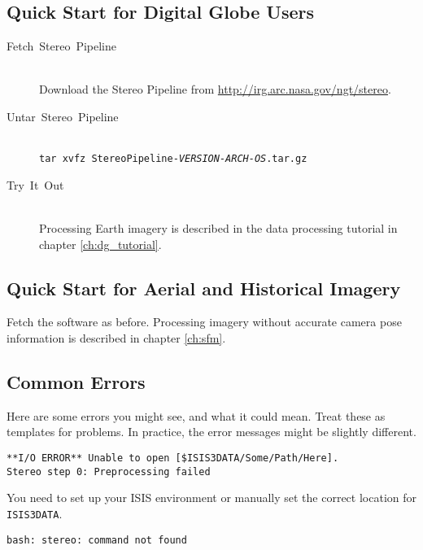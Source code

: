 \subsection{Quick Start for Digital Globe Users}
\label{quickstartDG}
\begin{description}

\item[{Fetch~Stereo~Pipeline}] ~\\
Download the Stereo Pipeline from \url{http://irg.arc.nasa.gov/ngt/stereo}.

\item[{Untar~Stereo~Pipeline}] ~\\
\texttt{tar xvfz StereoPipeline-\textit{VERSION-ARCH-OS}.tar.gz}

\item [{Try~It~Out}] ~\\
Processing Earth imagery is described in the data processing tutorial
in chapter \ref{ch:dg_tutorial}.

\end{description}

\subsection{Quick Start for Aerial and Historical Imagery}
\label{quickstartAerial}

Fetch the software as before. Processing imagery without accurate camera
pose information is described in chapter \ref{ch:sfm}.

\subsection{Common Errors}

Here are some errors you might see, and what it could mean. Treat
these as templates for problems.  In practice, the error messages might
be slightly different.

\begin{verbatim}
**I/O ERROR** Unable to open [$ISIS3DATA/Some/Path/Here].
Stereo step 0: Preprocessing failed
\end{verbatim} %

You need to set up your ISIS environment or manually set the correct
location for \texttt{ISIS3DATA}.

\begin{verbatim}
bash: stereo: command not found
\end{verbatim}

